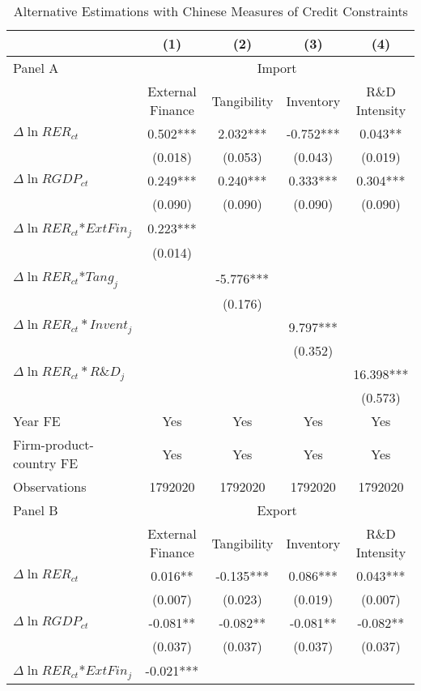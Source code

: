 \documentclass[12pt]{article}
\begin{document}
\begin{table}[htbp]
	\centering
	\caption{Alternative Estimations with Chinese Measures of Credit Constraints}
	\begin{threeparttable}
	\begin{tabular}{lcccc}
		\toprule
		& (1)   & (2)   & (3)   & (4) \\
		\midrule
		Panel A & \multicolumn{4}{c}{Import} \\
		& External Finance & Tangibility & Inventory & R\&D Intensity \\
		\midrule
		$\Delta \ln RER_{ct}$ & 0.502*** & 2.032*** & -0.752*** & 0.043** \\
		& (0.018) & (0.053) & (0.043) & (0.019) \\
		$\Delta \ln RGDP_{ct}$ & 0.249*** & 0.240*** & 0.333*** & 0.304*** \\
		& (0.090) & (0.090) & (0.090) & (0.090) \\
		$\Delta \ln RER_{ct}$*$ExtFin_{j}$ & 0.223*** &       &       &  \\
		& (0.014) &       &       &  \\
		$\Delta \ln RER_{ct}$*$Tang_{j}$ &       & -5.776*** &       &  \\
		&       & (0.176) &       &  \\
		$\Delta \ln RER_{ct}*Invent_{j}$ &       &       & 9.797*** &  \\
		&       &       & (0.352) &  \\
		$\Delta \ln RER_{ct}*R\&D_{j}$ &       &       &       & 16.398*** \\
		&       &       &       & (0.573) \\
		Year FE  & Yes   & Yes   & Yes   & Yes \\
		Firm-product-country FE & Yes   & Yes   & Yes   & Yes \\
		Observations & 1792020 & 1792020 & 1792020 & 1792020 \\
		\midrule
		Panel B & \multicolumn{4}{c}{Export} \\
		& External Finance & Tangibility & Inventory & R\&D Intensity \\
		\midrule
		$\Delta \ln RER_{ct}$ & 0.016** & -0.135*** & 0.086*** & 0.043*** \\
		& (0.007) & (0.023) & (0.019) & (0.007) \\
		$\Delta \ln RGDP_{ct}$ & -0.081** & -0.082** & -0.081** & -0.082** \\
		& (0.037) & (0.037) & (0.037) & (0.037) \\
		$\Delta \ln RER_{ct}$*$ExtFin_{j}$ & -0.021*** &       &       &  \\

\end{tabular}
\end{threeparttable}
\end{table}
\end{document}
